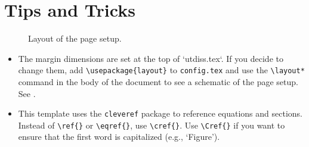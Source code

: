 \chapter{Tips and Tricks}
\label{appendix:tips}

\begin{figure}
    \centering
    \layout*
    \vspace{.75in}
    \caption{Layout of the page setup.}
    \label{figure:layout}
\end{figure}

\begin{itemize}
\item The margin dimensions are set at the top of `utdiss.tex`. If you decide to change them, add \verb"\usepackage{layout}" to \texttt{config.tex} and use the \verb"\layout*" command in the body of the document to see a schematic of the page setup.
See .

\item This template uses the \texttt{cleveref} package to reference equations and sections.
Instead of \verb"\ref{}" or \verb"\eqref{}", use \verb"\cref{}".
Use \verb"\Cref{}" if you want to ensure that the first word is capitalized (e.g., `Figure').
\end{itemize}
